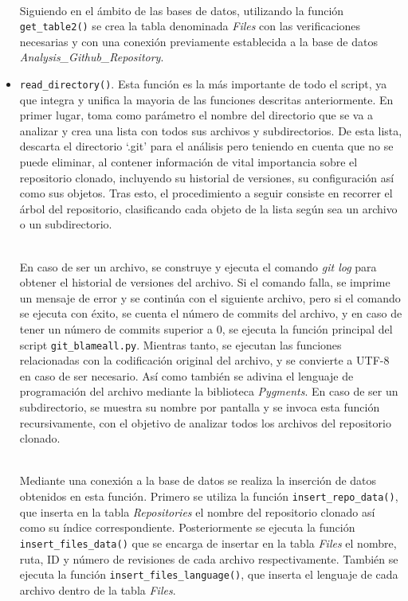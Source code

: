 \documentclass[a4paper, 12pt]{book}
\begin{document}
\begin{itemize}
  \\Siguiendo en el ámbito de las bases de datos, utilizando la función \texttt{get\_table2()} se crea la tabla denominada \textit{Files} con las verificaciones necesarias y con una conexión previamente establecida a la base de datos \textit{Analysis\_Github\_Repository}.

  \item \texttt{read\_directory()}. Esta función es la más importante de todo el script, ya que integra y unifica la mayoria de las funciones descritas anteriormente. En primer lugar, toma como parámetro el nombre del directorio que se va a analizar y crea una lista con todos sus archivos y subdirectorios.
  De esta lista, descarta el directorio `.git' para el análisis pero teniendo en cuenta que no se puede eliminar, al contener información de vital importancia sobre el repositorio clonado, incluyendo su historial de versiones, su configuración así como sus objetos. Tras esto, el procedimiento a seguir consiste
  en recorrer el árbol del repositorio, clasificando cada objeto de la lista según sea un archivo o un subdirectorio. 
  
  \\En caso de ser un archivo, se construye y ejecuta el comando \textit{git log} para obtener el historial de versiones del archivo. Si el comando falla, se imprime un mensaje de error y se continúa con el siguiente archivo, pero si el comando se ejecuta con éxito, se cuenta el número de commits del archivo, y 
  en caso de tener un número de commits superior a 0, se ejecuta la función principal del script \texttt{git\_blameall.py}. Mientras tanto, se ejecutan las funciones relacionadas con la codificación original del archivo, y se convierte a UTF-8 en caso de ser necesario. Así como también se adivina el lenguaje de
  programación del archivo mediante la biblioteca \textit{Pygments}. En caso de ser un subdirectorio, se muestra su nombre por pantalla y se invoca esta función recursivamente, con el objetivo de analizar todos los archivos del repositorio clonado.
  
  \\Mediante una conexión a la base de datos se realiza la inserción de datos obtenidos en esta función. Primero se utiliza la función \texttt{insert\_repo\_data()}, que inserta en la tabla \textit{Repositories} el nombre del repositorio clonado así como su índice correspondiente. Posteriormente se ejecuta la función
  \texttt{insert\_files\_data()} que se encarga de insertar en la tabla \textit{Files} el nombre, ruta, ID y número de revisiones de cada archivo respectivamente. También se ejecuta la función \texttt{insert\_files\_language()}, que inserta el lenguaje de cada archivo dentro de la tabla \textit{Files}.
\end{itemize}
\end{document}
